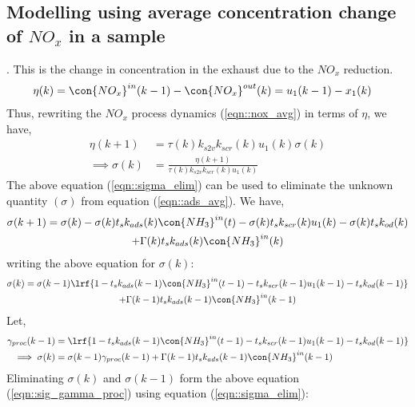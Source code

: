 \subsection{Modelling using average concentration change of $NO_x$ in a sample}
. This is the change in concentration in the exhaust due to the $NO_x$ reduction.
%
\begin{align}
        \eta(k) &= \con{NO_x}^{in}(k-1) - \con{NO_x}^{out}(k) = u_1(k-1) - x_1(k)
\end{align}
%
Thus, rewriting the $NO_x$ process dynamics (\ref{eqn::nox_avg}) in terms of $\eta$, we have,
\begin{align}
        \eta(k+1) &= \tau(k) k_{s2v} k_{scr}(k) u_1(k) \sigma(k)\\
        \implies \sigma(k) &= \frac{\eta(k+1)}{\tau(k) k_{s2v} k_{scr}(k) u_1(k)}
        \label{eqn::sigma_elim}
\end{align}
%
The above equation (\ref{eqn::sigma_elim}) can be used to eliminate the unknown quantity $(\sigma)$ from equation (\ref{eqn::ads_avg}). We have,
\begin{multline}
        \sigma(k+1) = \sigma(k) - \sigma(k) t_s k_{ads}(k) \con{NH_3}^{in}(t)
                        - \sigma(k) t_s k_{scr}(k) u_1(k)
                        - \sigma(k) t_s k_{od}(k)
                        \\ + \Gamma(k) t_s k_{ads}(k) \con{NH_3}^{in}(k)
\end{multline}
writing the above equation for $\sigma(k)$:
\begin{multline*}
         \sigma(k) = \sigma(k-1)\lrf{1 -  t_s k_{ads}(k-1) \con{NH_3}^{in}(t-1)
                        -  t_s k_{scr}(k-1) u_1(k-1)
                        -  t_s k_{od}(k-1)}
                        \\ + \Gamma(k-1) t_s k_{ads}(k-1) \con{NH_3}^{in}(k-1)
\end{multline*}
Let,
\begin{align}
        \gamma_{proc}(k-1) &= \lrf{1 -  t_s k_{ads}(k-1) \con{NH_3}^{in}(t-1)
                        -  t_s k_{scr}(k-1) u_1(k-1)
                        -  t_s k_{od}(k-1)}
        \label{eqn::gamma_proc}
        \\
        \implies \sigma(k) &= \sigma(k-1) \gamma_{proc}(k-1) + \Gamma(k-1) t_s k_{ads}(k-1) \con{NH_3}^{in}(k-1)
        \label{eqn::sig_gamma_proc}
\end{align}
Eliminating $\sigma(k)$ and $\sigma(k-1)$ form the above equation (\ref{eqn::sig_gamma_proc}) using equation (\ref{eqn::sigma_elim}):
